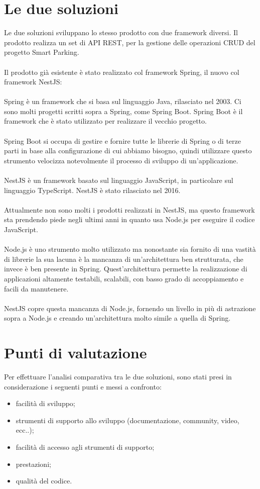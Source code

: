 \section{Le due soluzioni}
Le due soluzioni sviluppano lo stesso prodotto con due framework diversi.
Il prodotto realizza un set di \gls{API} \gls{REST}, per la gestione delle operazioni \gls{CRUD} del
progetto Smart Parking.
\\\\
Il prodotto già esistente è stato realizzato col framework Spring, il nuovo col framework NestJS:
\\\\
Spring è un framework che si basa sul linguaggio Java, rilasciato nel 2003. Ci sono molti progetti scritti
sopra a Spring, come Spring Boot. Spring Boot è il framework che è stato utilizzato per realizzare il vecchio progetto.
\\\\
Spring Boot si occupa di gestire
e fornire tutte le librerie di Spring o di terze parti in base alla configurazione di cui abbiamo bisogno, quindi 
utilizzare questo strumento velocizza notevolmente il processo di sviluppo di un'applicazione.
\\\\
NestJS è un framework basato sul linguaggio JavaScript, in particolare sul linguaggio TypeScript. NestJS è
stato rilasciato nel 2016.
\\\\
Attualmente non sono molti i prodotti realizzati in NestJS, ma questo framework sta prendendo piede negli ultimi anni in quanto
usa Node.js per eseguire il codice JavaScript.
\\\\
Node.js è uno strumento molto utilizzato ma nonostante sia fornito di una vastità di librerie la sua lacuna è la mancanza
di un'architettura ben strutturata, che invece è ben presente in Spring. Quest'architettura 
permette la realizzazione di applicazioni altamente testabili, scalabili, con basso grado di accoppiamento
e facili da manutenere.
\\\\
NestJS copre questa mancanza di Node.js, fornendo un livello in più di astrazione sopra a Node.js e creando un'architettura 
molto simile a quella di Spring.
\section{Punti di valutazione}
Per effettuare l'analisi comparativa tra le due soluzioni, sono stati presi in considerazione i seguenti 
punti e messi a confronto:
\begin{itemize}
    \item facilità di sviluppo;
    \item strumenti di supporto allo sviluppo (documentazione, community, video, ecc..);
    \item facilità di accesso agli strumenti di supporto;
    \item prestazioni;
    \item qualità del codice.
\end{itemize}

